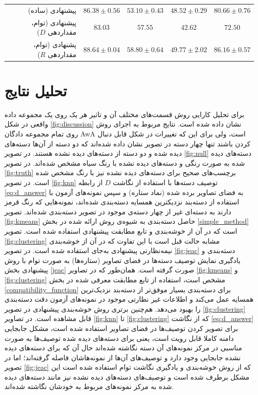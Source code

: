 \begin{table}[ht]
{\begin{tabular}{|r|r|c|c|c|c|}
& پیشنهادی (ساده)
                        & $86.38 \pm 0.56$              & $ 53.10\pm 0.43 $             & $48.52 \pm 0.29$              &$ 80.66 \pm 0.76$ \\
& پیشنهادی (توام، مقداردهی $D$)
                     & $83.03$                        & $57.55$                       & $42.62$          & $72.50$\\
& پشنهادی (توام، مقداردهی $R$)
                     & \textbf{\em $88.64 \pm 0.04$}  & \textbf{\em $58.80 \pm 0.64$} & $49.77 \pm 2.02$ & \textbf{\em $86.16 \pm 0.57$} \\
\hline
\end{tabular}
}
\end{table}

\section{تحلیل نتایج}\label{exp:discussion}
برای تحلیل کارایی روش قسمت‌های مختلف آن و تاثیر هر یک  روی یک مجموعه داده واقعی در شکل
\ref{fig:discussion}
 نشان داده شده است. نتایج مربوط به اجرای روش روی تمام مجموعه دادگان AwA است، ولی برای این که تغییرات در شکل قابل دنبال کردن باشند تنها چهار دسته در  تصویر نشان داده شده‌اند که دو دسته از آن‌ها دسته‌های دیده شده و دو دسته از دسته‌های دیده نشده هستند. در تصویر
\ref{fig:null}
دسته‌های دیده شده به صورت رنگی و دسته‌های دیده نشده با رنگ سیاه مشخص شده‌اند. در تصویر
\ref{fig:truth}
برچسب‌های صحیح برای دسته‌های دیده نشده نیز با رنگ مشخص شده است. در تصویر
\ref{fig:knn}
توصیف دسته‌ها با استفاده از نگاشت $D$ از رابطه \eqref{eq:d_answer} به فضای تصاویر برده شده (نماد ستاره) و سپس نمونه‌های آزمون با استفاده از دسته‌بند نزدیکترین همسایه دسته‌بندی شده‌اند، نمونه‌هایی که رنگ قرمز دارند به دسته‌ای غیر از چهار دسته‌ی موجود در تصویر دسته‌بندی شده‌اند. تصویر
\ref{fig:kmeans}
حاصل دسته‌بندی به شیوه‌ی روش ارائه شده در بخش \ref{simple_method} است که در آن از خوشه‌بندی  و تابع مطابقت پیشنهادی استفاده شده است. تصویر
\ref{fig:clustering}
مشابه حالت قبل است با این تفاوت که در آن از خوشه‌بندی نیمه‌نظارتی پیشنهادی به‌جای  استفاده شده است. در تصویر
\ref{fig:jeac}
دسته‌بندی و یادگیری نمایش توصیف دسته‌ها در فضای تصاویر (ستاره‌ها) به صورت توام با روش پیشنهادی بخش \ref{jeac} صورت گرفته است.
همان‌طور که در تصاویر
\ref{fig:kmeans} و \ref{fig:clustering}
مشخص است، استفاده از  تابع مطابقت معرفی شده در بخش \ref{compatibility_function} برای دسته‌بندی بسیار موفق‌تر از دسته‌بند نزدیک‌ترین همسایه عمل می‌کند و اطلاعات غیر نظارتی موجود در نمونه‌های آزمون دقت  دسته‌بندی را بهبود می‌دهد. هم‌چنین برتری روش خوشه‌بندی پیشنهادی در تصویر \ref{fig:clustering} قابل مشاهده است. در تصاویر \ref{fig:knn} تا \ref{fig:clustering} که از نگاشت  \eqref{eq:d_answer} برای تصویر کردن توصیف‌ها در فضای تصاویر استفاده شده است، مشکل جابجایی دامنه کاملا قابل رویت است، یعنی برای دسته‌های دیده شده توصیف‌ها به صورت مناسبی در مرکز نمونه‌های آن دسته نگاشته شده‌اند حال آن که برای دسته‌های دیده نشده جابجایی وجود دارد و توصیف‌های آن‌ها از نمونه‌هاشان فاصله گرفته‌اند؛ اما در تصویر
\ref{fig:jeac}
که از روش خوشه‌بندی و یادگیری نگاشت توام استفاده شده است این مشکل برطرف شده است و توصیف‌های دسته‌های دیده نشده نیز مانند دسته‌های دیده شده به مرکز نمونه‌های مربوط به خودشان نگاشته شده‌اند.

